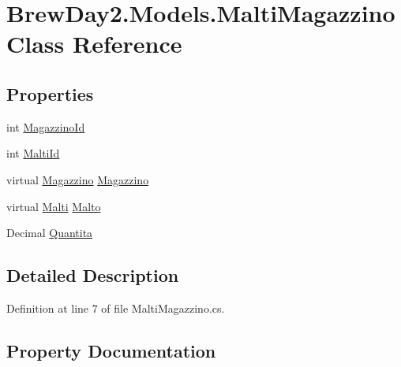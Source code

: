 \hypertarget{class_brew_day2_1_1_models_1_1_malti_magazzino}{}\section{Brew\+Day2.\+Models.\+Malti\+Magazzino Class Reference}
\label{class_brew_day2_1_1_models_1_1_malti_magazzino}
\subsection*{Properties}
\begin{DoxyCompactItemize}
\item 
int \mbox{\hyperlink{class_brew_day2_1_1_models_1_1_malti_magazzino_ab0905e032f89caaf750635049430d14b}{Magazzino\+Id}}
\item 
int \mbox{\hyperlink{class_brew_day2_1_1_models_1_1_malti_magazzino_a4d9c9398012dd0d8f8b6841937c5e7f1}{Malti\+Id}}
\item 
virtual \mbox{\hyperlink{class_brew_day2_1_1_models_1_1_magazzino}{Magazzino}} \mbox{\hyperlink{class_brew_day2_1_1_models_1_1_malti_magazzino_a242663404e79d7d458a716539542caea}{Magazzino}}
\item 
virtual \mbox{\hyperlink{class_brew_day2_1_1_models_1_1_malti}{Malti}} \mbox{\hyperlink{class_brew_day2_1_1_models_1_1_malti_magazzino_aac03b4ea04e251af7a4d339397028953}{Malto}}
\item 
Decimal \mbox{\hyperlink{class_brew_day2_1_1_models_1_1_malti_magazzino_afa1b9aa1aba7024ce7c719e74dd12b7a}{Quantita}}
\end{DoxyCompactItemize}


\subsection{Detailed Description}


Definition at line 7 of file Malti\+Magazzino.\+cs.



\subsection{Property Documentation}
\mbox{\label{class_brew_day2_1_1_models_1_1_malti_magazzino_a242663404e79d7d458a716539542caea}} 
